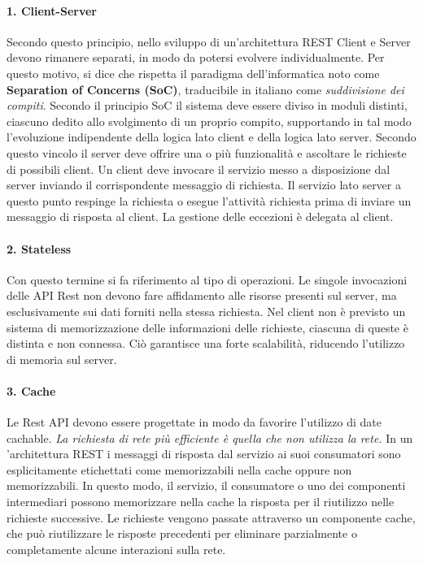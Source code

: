 \paragraph{1. Client-Server} Secondo questo principio, nello sviluppo di un'architettura REST Client e Server devono rimanere separati, in modo da potersi evolvere individualmente. Per questo motivo, si dice che rispetta il paradigma dell'informatica noto come \textbf{Separation of Concerns (SoC)}, traducibile in italiano come \emph{suddivisione dei compiti}. Secondo il principio SoC il sistema deve essere diviso in moduli distinti, ciascuno dedito allo svolgimento di un proprio compito, supportando in tal modo l’evoluzione indipendente della logica lato client e della logica lato server. Secondo questo vincolo il server deve offrire una o più funzionalità e ascoltare le richieste di possibili client. Un client deve invocare il servizio messo a disposizione dal server inviando il corrispondente messaggio di richiesta. Il servizio lato server a questo punto respinge la richiesta o esegue l’attività richiesta prima di inviare un messaggio di risposta al client. La gestione delle eccezioni è delegata al client.

\paragraph{2. Stateless} Con questo termine si fa riferimento al tipo di operazioni. Le singole invocazioni delle API Rest non devono fare affidamento alle risorse presenti sul server, ma esclusivamente sui dati forniti nella stessa richiesta. Nel client non è previsto un sistema di memorizzazione delle informazioni delle richieste, ciascuna di queste è distinta e non connessa. Ciò garantisce una forte scalabilità, riducendo l'utilizzo di memoria sul server.

\paragraph{3. Cache} Le Rest API devono essere progettate in modo da favorire l'utilizzo di date cachable. \emph{La richiesta di rete più efficiente è quella che non utilizza la rete.} In un 'architettura REST i messaggi di risposta dal servizio ai suoi consumatori sono esplicitamente etichettati come memorizzabili nella cache oppure non memorizzabili. In questo modo, il servizio, il consumatore o uno dei componenti intermediari possono memorizzare nella cache la risposta per il riutilizzo nelle richieste successive. Le richieste vengono passate attraverso un componente cache, che può riutilizzare le risposte precedenti per eliminare parzialmente o completamente alcune interazioni sulla rete.

